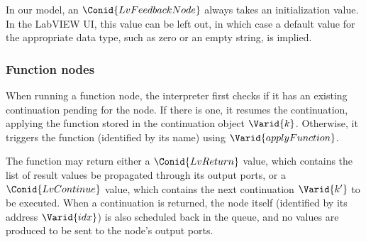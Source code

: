 In our model, an \ensuremath{\Conid{LvFeedbackNode}} always takes an initialization value. In the
LabVIEW UI, this value can be left out, in which case a default value for the
appropriate data type, such as zero or an empty string, is implied.

\resethooks

\subsubsection{Function nodes}
\label{functionnodes}

When running a function node, the interpreter first checks if it has an
existing continuation pending for the node. If there is one, it resumes the
continuation, applying the function stored in the continuation object \ensuremath{\Varid{k}}.
Otherwise, it triggers the function (identified by its name) using
\ensuremath{\Varid{applyFunction}}.

The function may return either a \ensuremath{\Conid{LvReturn}} value, which contains the list of
result values be propagated through its output ports, or a \ensuremath{\Conid{LvContinue}} value,
which contains the next continuation \ensuremath{\Varid{k'}} to be executed. When a continuation
is returned, the node itself (identified by its address \ensuremath{\Varid{idx}}) is also
scheduled back in the queue, and no values are produced to be sent to the
node's output ports.

